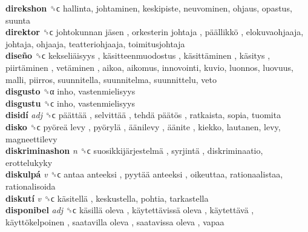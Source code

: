 \textbf{direkshon} ␝ϲ  hallinta, johtaminen, keskipiste, neuvominen, ohjaus, opastus, suunta  \\
\textbf{direktor} ␝ϲ   johtokunnan jäsen ,  orkesterin johtaja ,  päällikkö , elokuvaohjaaja, johtaja, ohjaaja, teatteriohjaaja, toimitusjohtaja  \\
\textbf{diseño} ␝ϲ   kekseliäisyys ,  käsitteenmuodostus ,  käsittäminen ,  käsitys ,  piirtäminen ,  vetäminen , aikoa, aikomus, innovointi, kuvio, luonnos, luovuus, malli, piirros, suunnitella, suunnitelma, suunnittelu, veto  \\
\textbf{disgusto} ␝α  inho, vastenmielisyys  \\
\textbf{disgustu} ␝ϲ  inho, vastenmielisyys  \\
\textbf{disidí} \emph{adj}  ␝ϲ   päättää ,  selvittää ,  tehdä päätös , ratkaista, sopia, tuomita  \\
\textbf{disko} ␝ϲ   pyöreä levy ,  pyörylä ,  äänilevy ,  äänite , kiekko, lautanen, levy, magneettilevy  \\
\textbf{diskriminashon} \emph{n}  ␝ϲ   suosikkijärjestelmä ,  syrjintä , diskriminaatio, erottelukyky  \\
\textbf{diskulpá} \emph{v}  ␝ϲ   antaa anteeksi ,  pyytää anteeksi , oikeuttaa, rationaalistaa, rationalisoida  \\
\textbf{diskutí} \emph{v}  ␝ϲ   käsitellä , keskustella, pohtia, tarkastella  \\
\textbf{disponibel} \emph{adj}  ␝ϲ   käsillä oleva ,  käytettävissä oleva ,  käytettävä ,  käyttökelpoinen ,  saatavilla oleva ,  saatavissa oleva , vapaa  \\
